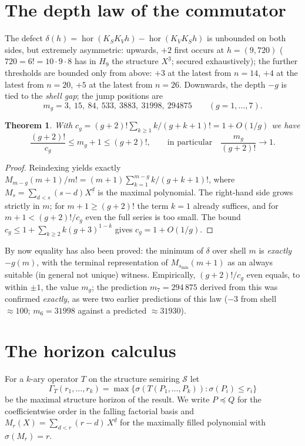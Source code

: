 \documentclass[11pt]{article}
\newtheorem{satz}{Theorem}[section]
\theoremstyle{definition}
\theoremstyle{remark}
\newcommand{\Struk}{\mathcal S}
\newcommand{\ff}[2]{#1^{\underline{#2}}}
\newcommand{\KV}{K_V}
\newcommand{\KS}{K_S}
\begin{document}
\section{The depth law of the commutator}

The defect
$\delta(h)=\operatorname{hor}(\KS\KV h)-\operatorname{hor}(\KV\KS h)$
is unbounded on both sides, but extremely asymmetric: upwards, $+2$
first occurs at $h=(9,720)$ ($720=6!=10\cdot9\cdot8$ has in
$H_9$ the structure $\ff X3$; secured exhaustively); the further
thresholds are bounded only from above: $+3$ at the latest from
$n=14$, $+4$ at the latest from $n=20$, $+5$ at the latest from
$n=26$. Downwards, the depth $-g$ is tied to the \emph{shell gap};
the jump positions are
\[
m_g=3,\ 15,\ 84,\ 533,\ 3883,\ 31998,\ 294875\qquad(g=1,\dots,7).
\]

\begin{satz}\label{satz:asymptotik}
With $c_g=(g{+}2)!\sum_{k\ge1}k/(g{+}k{+}1)!=1+O(1/g)$ we have
\[
\frac{(g+2)!}{c_g}\le m_g+1\le(g+2)!,
\qquad\text{in particular}\quad
\frac{m_g}{(g+2)!}\to1 .
\]
\end{satz}

\begin{proof}
Reindexing yields exactly
$M_{m-g}(m{+}1)/m!=(m{+}1)\sum_{k=1}^{m-g}k/(g{+}k{+}1)!$, where
$M_s=\sum_{d<s}(s{-}d)\ff Xd$ is the maximal polynomial. The
right-hand side grows strictly in $m$; for $m{+}1\ge(g{+}2)!$ the
term $k{=}1$ already suffices, and for $m{+}1<(g{+}2)!/c_g$ even
the full series is too small. The bound
$c_g\le1+\sum_{k\ge2}k(g{+}3)^{1-k}$
gives $c_g=1+O(1/g)$.
\end{proof}

By now equality has also been proved: the minimum of
$\delta$ over shell $m$ is \emph{exactly} $-g(m)$, with the
terminal representation of $M_{s_{\min}}(m{+}1)$ as an always
suitable (in general not unique) witness.
Empirically, $(g{+}2)!/c_g$ even equals, to within $\pm1$, the
value $m_g$; the prediction $m_7=294\,875$ derived from this was
confirmed \emph{exactly}, as were two earlier predictions of this
law ($-3$ from shell ${\approx}100$; $m_6=31998$ against a
predicted ${\approx}31930$).

\section{The horizon calculus}

For a $k$-ary operator $T$ on the structure semiring
$\Struk$ let
\[
\Gamma_T(r_1,\ldots,r_k)=\max\{\sigma(T(P_1,\ldots,P_k)):
\sigma(P_i)\le r_i\}
\]
be the maximal structure horizon of the result.
We write $P\preceq Q$ for the coefficientwise order in the falling
factorial basis and
$M_r(X)=\sum_{d<r}(r{-}d)\,\ff Xd$ for the maximally filled
polynomial with $\sigma(M_r)=r$.
\end{document}
